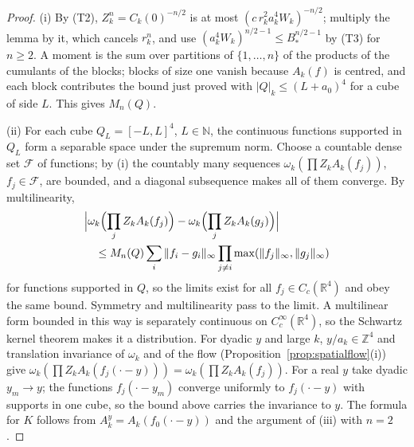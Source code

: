 \documentclass[aps,prd,twocolumn,superscriptaddress,nofootinbib,longbibliography,floatfix,amsmath,amssymb,10pt]{revtex4-2}
\theoremstyle{definition}
\theoremstyle{remark}
\newcommand{\R}{\mathbb{R}}
\newcommand{\Z}{\mathbb{Z}}
\begin{document}
\begin{proof}
(i) By (T2), $Z_k^n=C_k(0)^{-n/2}$ is at most $(c\,r_k^2a_k^4W_k)^{-n/2}$;
multiply the lemma by it, which cancels $r_k^n$, and use
$(a_k^4W_k)^{n/2-1}\le B_*^{n/2-1}$ by (T3) for $n\ge2$. A
moment is the sum over partitions of $\{1,\dots,n\}$ of the products of the
cumulants of the blocks; blocks of size one vanish because $A_k(f)$ is
centred, and each block contributes the bound just proved with
$|Q|_k\le(L+a_0)^4$ for a cube of side $L$. This gives $M_n(Q)$.

(ii) For each cube $Q_L=[-L,L]^4$, $L\in\mathbb N$, the continuous functions
supported in $Q_L$ form a separable space under the supremum norm. Choose a
countable dense set $\mathcal F$ of functions; by (i) the countably many
sequences $\omega_k(\prod Z_kA_k(f_j))$, $f_j\in\mathcal F$, are bounded, and
a diagonal subsequence makes all of them converge. By multilinearity,
\[
\begin{split}
&\Bigl|\omega_k\Bigl(\prod_jZ_kA_k(f_j)\Bigr)
-\omega_k\Bigl(\prod_jZ_kA_k(g_j)\Bigr)\Bigr|\\
&\quad\le M_n(Q)\sum_i\|f_i-g_i\|_\infty
\prod_{j\ne i}\max(\|f_j\|_\infty,\|g_j\|_\infty)
\end{split}
\]
for functions supported in $Q$, so the limits exist for all $f_j\in C_c(\R^4)$
and obey the same bound. Symmetry and multilinearity pass to the limit. A
multilinear form bounded in this way is separately continuous on
$C^\infty_c(\R^4)$, so the Schwartz kernel theorem makes it a distribution.
For dyadic $y$ and large $k$, $y/a_k\in\Z^4$ and translation invariance of
$\omega_k$ and of the flow (Proposition~\ref{prop:spatialflow}(i)) give
$\omega_k(\prod Z_kA_k(f_j(\cdot-y)))=\omega_k(\prod Z_kA_k(f_j))$. For a real
$y$ take dyadic $y_m\to y$; the functions $f_j(\cdot-y_m)$ converge uniformly
to $f_j(\cdot-y)$ with supports in one cube, so the bound above carries the
invariance to $y$. The formula for $K$ follows from $A^y_k=A_k(f_0(\cdot-y))$
and the argument of (iii) with $n=2$.


\end{proof}
\end{document}
